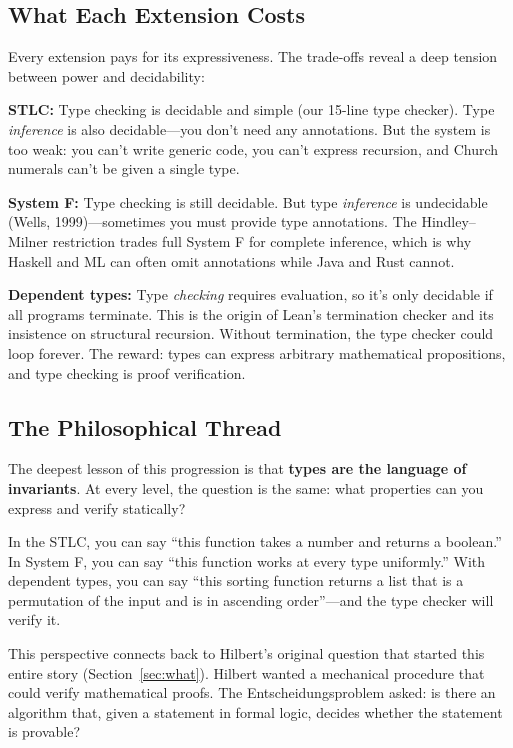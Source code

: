 \documentclass[11pt,a4paper]{article}
\theoremstyle{definition}
\begin{document}
\subsection{What Each Extension Costs}

Every extension pays for its expressiveness. The trade-offs reveal a deep
tension between power and decidability:

\textbf{STLC:} Type checking is decidable and simple (our 15-line type
checker). Type \emph{inference} is also decidable---you don't need any
annotations. But the system is too weak: you can't write generic code, you
can't express recursion, and Church numerals can't be given a single type.

\textbf{System F:} Type checking is still decidable. But type
\emph{inference} is undecidable (Wells, 1999)---sometimes you must provide
type annotations. The Hindley--Milner restriction trades full System F for
complete inference, which is why Haskell and ML can often omit annotations
while Java and Rust cannot.

\textbf{Dependent types:} Type \emph{checking} requires evaluation, so it's
only decidable if all programs terminate. This is the origin of Lean's
termination checker and its insistence on structural recursion. Without
termination, the type checker could loop forever. The reward: types can express
arbitrary mathematical propositions, and type checking is proof verification.

\subsection{The Philosophical Thread}

The deepest lesson of this progression is that \textbf{types are the
language of invariants}. At every level, the question is the same: what
properties can you express and verify statically?

In the STLC, you can say ``this function takes a number and returns a
boolean.'' In System F, you can say ``this function works at every type
uniformly.'' With dependent types, you can say ``this sorting function
returns a list that is a permutation of the input and is in ascending
order''---and the type checker will verify it.

This perspective connects back to Hilbert's original question that started
this entire story (Section~\ref{sec:what}). Hilbert wanted a mechanical
procedure that could verify mathematical proofs. The Entscheidungsproblem
asked: is there an algorithm that, given a statement in formal logic, decides
whether the statement is provable?
\end{document}
